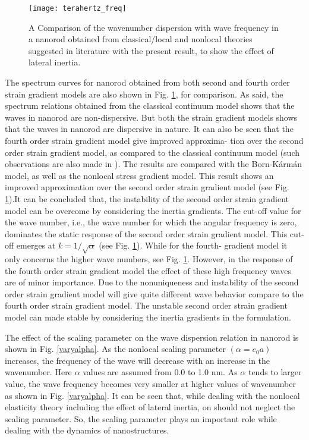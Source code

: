 \begin{figure}
\centering
\texttt{[image: terahertz\_freq]}
\caption{A Comparison of the wavenumber dispersion with wave frequency in a
nanorod obtained from classical/local and nonlocal theories suggested in literature
with the present result, to show the effect of lateral inertia.}
\label{terahertz_freqresp}
\end{figure}

The spectrum curves for nanorod obtained from both second
and fourth order strain gradient models are also shown in Fig. \ref{terahertz_freqresp}, for
comparison. As said, the spectrum relations obtained from the
classical continuum model shows that the waves in nanorod are
non-dispersive. But both the strain gradient models shows that the
waves in nanorod are dispersive in nature. It can also be seen that
the fourth order strain gradient model give improved approxima-
tion over the second order strain gradient model, as compared to
the classical continuum model (such observations are also made
in \cite{narendar2010ultrasonic}). The results are compared with the Born-K\'arm\'an model, as well as the nonlocal stress gradient model. This result shows an improved approximation over the second
order strain gradient model (see Fig. \ref{terahertz_freqresp}).It can be concluded that, the
instability of the second order strain gradient model can be
overcome by considering the inertia gradients.
The cut-off value for the wave number, i.e., the
wave number for which the angular frequency is zero, dominates
the static response of the second order strain gradient model. This cut-off emerges at $k=1/\sqrt{\alpha}$ (see Fig. \ref{terahertz_freqresp}). While for the fourth-
gradient model it only concerns the higher wave numbers, see
Fig. \ref{terahertz_freqresp}. However, in the response of the fourth order strain gradient model the effect of these high frequency waves are of minor
importance. Due to the nonuniqueness and instability of the second
order strain gradient model will give quite different wave behavior
compare to the fourth order strain gradient model. The unstable
second order strain gradient model can made stable by considering
the inertia gradients in the formulation.

The effect of the scaling parameter on the wave dispersion
relation in nanorod is shown in Fig. \ref{varyalpha}. As the nonlocal scaling
parameter $(\alpha = e_0 a)$ increases, the frequency of the wave will
decrease with an increase in the wavenumber. Here $\alpha$ values are
assumed from 0.0 to 1.0 nm. As $\alpha$ tends to larger value, the wave
frequency becomes very smaller at higher values of wavenumber as
shown in Fig. \ref{varyalpha}. It can be seen that, while dealing with the nonlocal
elasticity theory including the effect of lateral inertia, on should not
neglect the scaling parameter. So, the scaling parameter plays an
important role while dealing with the dynamics of nanostructures.

